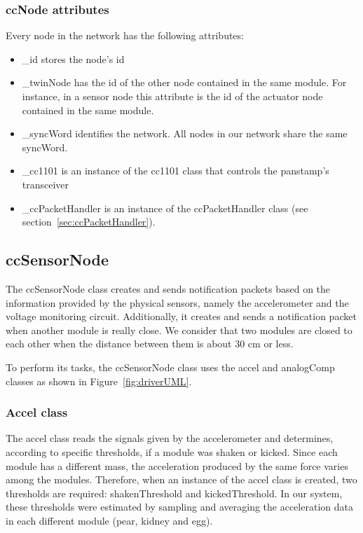 \subsubsection{ccNode attributes}
\label{sec:ccNode-attributes}
Every node in the network has the following attributes:
\begin{itemize}
\item \_id stores the node's id
\item \_twinNode has the id of the other node contained in the same module. For instance, in a sensor node this attribute is the id of the actuator node contained in the same module.
\item \_syncWord identifies the network. All nodes in our network share the same syncWord.  
\item \_cc1101 is an instance of the cc1101 class that controls the panstamp's transceiver 
\item \_ccPacketHandler is an instance of the ccPacketHandler class (see section~\ref{sec:ccPacketHandler}).
\end{itemize}
                        
\subsection{ccSensorNode}
The ccSensorNode class creates and sends notification packets based on the information provided by the physical sensors, namely the accelerometer and the voltage monitoring circuit. Additionally, it creates and sends a notification packet when another module is really close. We consider that two modules are closed to each other when the distance between them is about 30 cm or less.

To perform its tasks, the ccSensorNode class uses the accel and analogComp classes as shown in Figure~\ref{fig:driverUML}.

\subsubsection{Accel class}
\label{sec:Accel class}
The accel class reads the signals given by the accelerometer and determines, according to specific thresholds, if a module was shaken or kicked. Since each module has a different mass, the acceleration produced by the same force varies among the modules. Therefore, when an instance of the accel class is created, two thresholds are required: shakenThreshold and kickedThreshold. In our system, these thresholds were estimated by sampling and averaging the acceleration data in each different module (pear, kidney and egg).

